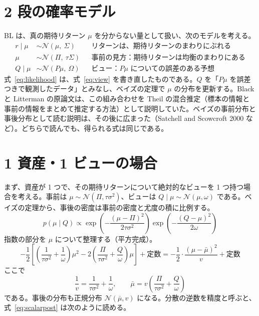 \documentclass[xelatex,ja=standard,jafont=hiragino-pron,a4paper,11pt,openany]{bxjsreport}
\newcommand{\mub}{\bar{\mu}}
\begin{document}
\section{2 段の確率モデル}

BL は、真の期待リターン $\mu$ を分からない量として扱い、次のモデルを考える。
\begin{align}
r \mid \mu &\sim \mathcal{N}(\mu,\ \Sigma) && \text{リターンは、期待リターンのまわりにぶれる} \label{eq:model1}\\
\mu &\sim \mathcal{N}(\Pi,\ \tau\Sigma) && \text{事前の見方：期待リターンは均衡のまわりにある} \label{eq:prior}\\
Q \mid \mu &\sim \mathcal{N}(P\mu,\ \Omega) && \text{ビュー：$P\mu$ についての誤差のある予想} \label{eq:likelihood}
\end{align}
式~\eqref{eq:likelihood} は、式~\eqref{eq:view} を書き直したものである。$Q$ を「$P\mu$ を誤差つきで観測したデータ」とみなし、ベイズの定理で $\mu$ の分布を更新する。Black と Litterman の原論文は、この組み合わせを Theil の混合推定（標本の情報と事前の情報をまとめて推定する方法）として説明していた。ベイズの事前分布と事後分布として読む説明は、その後に広まった（Satchell and Scowcroft 2000 など）。どちらで読んでも、得られる式は同じである。

\section{1 資産・1 ビューの場合}\label{sec:scalar}

まず、資産が 1 つで、その期待リターンについて絶対的なビューを 1 つ持つ場合を考える。事前は $\mu \sim \mathcal{N}(\Pi, \tau\sigma^2)$、ビューは $Q \mid \mu \sim \mathcal{N}(\mu, \omega)$ である。ベイズの定理から、事後の密度は事前の密度と尤度の積に比例する。
\[
p(\mu \mid Q) \propto
\exp\!\left(-\frac{(\mu - \Pi)^2}{2\tau\sigma^2}\right)
\exp\!\left(-\frac{(Q - \mu)^2}{2\omega}\right)
\]
指数の部分を $\mu$ について整理する（平方完成）。
\[
-\frac{1}{2}\left[\left(\frac{1}{\tau\sigma^2} + \frac{1}{\omega}\right)\mu^2 - 2\left(\frac{\Pi}{\tau\sigma^2} + \frac{Q}{\omega}\right)\mu\right] + \text{定数}
= -\frac{1}{2}\cdot\frac{(\mu - \mub)^2}{v} + \text{定数}
\]
ここで
\begin{equation}
\frac{1}{v} = \frac{1}{\tau\sigma^2} + \frac{1}{\omega},\qquad
\mub = v\left(\frac{\Pi}{\tau\sigma^2} + \frac{Q}{\omega}\right)
\label{eq:scalarpost}
\end{equation}
である。事後の分布も正規分布 $\mathcal{N}(\mub, v)$ になる。分散の逆数を精度と呼ぶと、式~\eqref{eq:scalarpost} は次のように読める。
\end{document}
